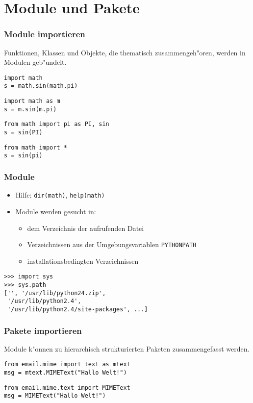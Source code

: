 \section{Module und Pakete}

\begin{frame}[fragile]
\frametitle{Module importieren}
Funktionen, Klassen und Objekte, die thematisch zusammengeh"oren, werden in Modulen geb"undelt.
\begin{lstlisting}[style=Python]
import math
s = math.sin(math.pi)
\end{lstlisting}
\begin{lstlisting}[style=Python]
import math as m
s = m.sin(m.pi)
\end{lstlisting}
\begin{lstlisting}[style=Python]
from math import pi as PI, sin
s = sin(PI)
\end{lstlisting}
\begin{lstlisting}[style=Python]
from math import *
s = sin(pi)
\end{lstlisting}
\end{frame}

\begin{frame}[fragile]
\frametitle{Module}
\begin{itemize}
\item Hilfe: \lstinline{dir(math)}, \lstinline{help(math)}
\item Module werden gesucht in:
\begin{itemize}
\item dem Verzeichnis der aufrufenden Datei
\item Verzeichnissen aus der Umgebungsvariablen \texttt{PYTHONPATH}
\item installationsbedingten Verzeichnissen 
\end{itemize}
\end{itemize}
\begin{lstlisting}[style=Shell]
>>> import sys
>>> sys.path
['', '/usr/lib/python24.zip',
 '/usr/lib/python2.4', 
 '/usr/lib/python2.4/site-packages', ...]
\end{lstlisting}
\end{frame}

\begin{frame}[fragile]
\frametitle{Pakete importieren}
Module k"onnen zu  hierarchisch strukturierten Paketen zusammengefasst werden.
\begin{lstlisting}[style=Python]
from email.mime import text as mtext
msg = mtext.MIMEText("Hallo Welt!")
\end{lstlisting}
\begin{lstlisting}[style=Python]
from email.mime.text import MIMEText
msg = MIMEText("Hallo Welt!")
\end{lstlisting}
\end{frame}

